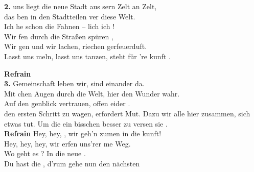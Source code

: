 

\noindent\textbf{2.}  uns liegt die neue Stadt aus sern Zelt an Zelt,\\
das ben in den Stadtteilen ver diese Welt.\\
Ich he schon die Fahnen – lich  ich !\\
Wir fen durch die Straßen spüren ,\\
Wir gen und wir lachen, riechen gerfeuerduft.\\
Lasst uns meln, lasst uns tanzen, steht für 're kunft .\\[0.5em]

\pagebreak

\noindent\textbf{Refrain}\\

\noindent\textbf{3.}  Gemeinschaft leben wir, sind einander da.\\
Mit chen Augen durch die Welt, hier den Wunder wahr.\\
Auf den genblick vertrauen, offen eider .\\
 den ersten Schritt zu wagen,  erfordert Mut.
Dazu  wir alle hier zusammen,  sich etwas tut.
Um die  ein bisschen besser zu versen  sie .\\[0.5em]

\noindent\textbf{Refrain} Hey, hey, , wir geh'n zumen in die kunft!\\
Hey, hey, hey, wir erfen uns'rer me Weg.\\
Wo geht es ? In die neue .\\
Du hast die , d'rum gehe nun den nächsten \\
